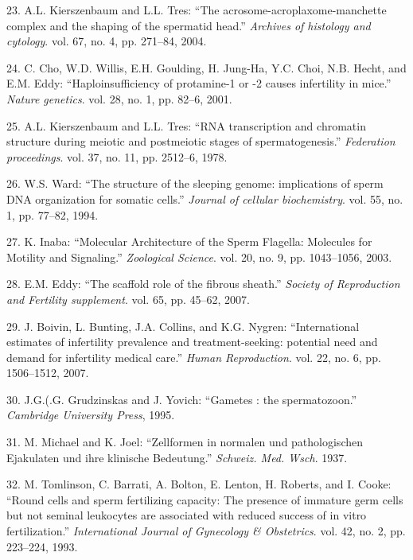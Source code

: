 \documentclass[12pt,twoside]{reedthesis}
\theoremstyle{definition}
\theoremstyle{definition}
\theoremstyle{remark}
\begin{document}
  \hypertarget{ref-Kierszenbaum2004}{}
  23. A.L. Kierszenbaum and L.L. Tres: ``The
  acrosome-acroplaxome-manchette complex and the shaping of the spermatid
  head.'' \emph{Archives of histology and cytology}. vol. 67, no. 4, pp.
  271--84, 2004.
  
  \hypertarget{ref-Cho2001}{}
  24. C. Cho, W.D. Willis, E.H. Goulding, H. Jung-Ha, Y.C. Choi, N.B.
  Hecht, and E.M. Eddy: ``Haploinsufficiency of protamine-1 or -2 causes
  infertility in mice.'' \emph{Nature genetics}. vol. 28, no. 1, pp.
  82--6, 2001.
  
  \hypertarget{ref-Kierszenbaum1978}{}
  25. A.L. Kierszenbaum and L.L. Tres: ``RNA transcription and chromatin
  structure during meiotic and postmeiotic stages of spermatogenesis.''
  \emph{Federation proceedings}. vol. 37, no. 11, pp. 2512--6, 1978.
  
  \hypertarget{ref-Ward1994}{}
  26. W.S. Ward: ``The structure of the sleeping genome: implications of
  sperm DNA organization for somatic cells.'' \emph{Journal of cellular
  biochemistry}. vol. 55, no. 1, pp. 77--82, 1994.
  
  \hypertarget{ref-Inaba2003}{}
  27. K. Inaba: ``Molecular Architecture of the Sperm Flagella: Molecules
  for Motility and Signaling.'' \emph{Zoological Science}. vol. 20, no. 9,
  pp. 1043--1056, 2003.
  
  \hypertarget{ref-Eddy2007}{}
  28. E.M. Eddy: ``The scaffold role of the fibrous sheath.''
  \emph{Society of Reproduction and Fertility supplement}. vol. 65, pp.
  45--62, 2007.
  
  \hypertarget{ref-Boivin2007a}{}
  29. J. Boivin, L. Bunting, J.A. Collins, and K.G. Nygren:
  ``International estimates of infertility prevalence and
  treatment-seeking: potential need and demand for infertility medical
  care.'' \emph{Human Reproduction}. vol. 22, no. 6, pp. 1506--1512, 2007.
  
  \hypertarget{ref-Grudzinskas1995}{}
  30. J.G.(.G. Grudzinskas and J. Yovich: ``Gametes : the spermatozoon.''
  \emph{Cambridge University Press}, 1995.
  
  \hypertarget{ref-Michael1937}{}
  31. M. Michael and K. Joel: ``Zellformen in normalen und pathologischen
  Ejakulaten und ihre klinische Bedeutung.'' \emph{Schweiz. Med. Wsch}.
  1937.
  
  \hypertarget{ref-Tomlinson1993a}{}
  32. M. Tomlinson, C. Barrati, A. Bolton, E. Lenton, H. Roberts, and I.
  Cooke: ``Round cells and sperm fertilizing capacity: The presence of
  immature germ cells but not seminal leukocytes are associated with
  reduced success of in vitro fertilization.'' \emph{International Journal
  of Gynecology \& Obstetrics}. vol. 42, no. 2, pp. 223--224, 1993.
  
\end{document}
